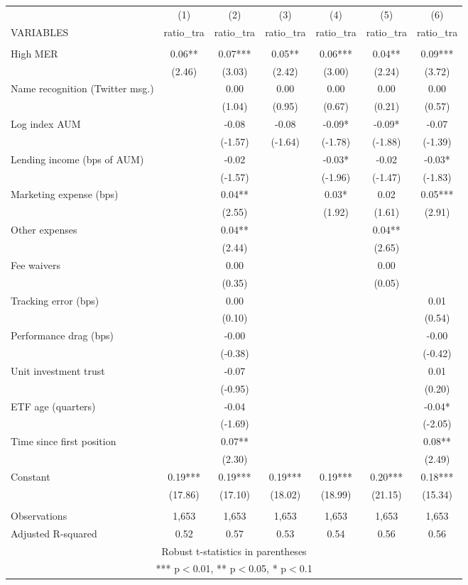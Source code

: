 \documentclass[]{article}
\begin{document}
\begin{tabular}{lcccccc} \hline
 & (1) & (2) & (3) & (4) & (5) & (6) \\
VARIABLES & ratio\_tra & ratio\_tra & ratio\_tra & ratio\_tra & ratio\_tra & ratio\_tra \\ \hline
 &  &  &  &  &  &  \\
High MER & 0.06** & 0.07*** & 0.05** & 0.06*** & 0.04** & 0.09*** \\
 & (2.46) & (3.03) & (2.42) & (3.00) & (2.24) & (3.72) \\
Name recognition (Twitter msg.) &  & 0.00 & 0.00 & 0.00 & 0.00 & 0.00 \\
 &  & (1.04) & (0.95) & (0.67) & (0.21) & (0.57) \\
Log index AUM &  & -0.08 & -0.08 & -0.09* & -0.09* & -0.07 \\
 &  & (-1.57) & (-1.64) & (-1.78) & (-1.88) & (-1.39) \\
Lending income (bps of AUM) &  & -0.02 &  & -0.03* & -0.02 & -0.03* \\
 &  & (-1.57) &  & (-1.96) & (-1.47) & (-1.83) \\
Marketing expense (bps) &  & 0.04** &  & 0.03* & 0.02 & 0.05*** \\
 &  & (2.55) &  & (1.92) & (1.61) & (2.91) \\
Other expenses &  & 0.04** &  &  & 0.04** &  \\
 &  & (2.44) &  &  & (2.65) &  \\
Fee waivers &  & 0.00 &  &  & 0.00 &  \\
 &  & (0.35) &  &  & (0.05) &  \\
Tracking error (bps) &  & 0.00 &  &  &  & 0.01 \\
 &  & (0.10) &  &  &  & (0.54) \\
Performance drag (bps) &  & -0.00 &  &  &  & -0.00 \\
 &  & (-0.38) &  &  &  & (-0.42) \\
Unit investment trust &  & -0.07 &  &  &  & 0.01 \\
 &  & (-0.95) &  &  &  & (0.20) \\
ETF age (quarters) &  & -0.04 &  &  &  & -0.04* \\
 &  & (-1.69) &  &  &  & (-2.05) \\
Time since first position &  & 0.07** &  &  &  & 0.08** \\
 &  & (2.30) &  &  &  & (2.49) \\
Constant & 0.19*** & 0.19*** & 0.19*** & 0.19*** & 0.20*** & 0.18*** \\
 & (17.86) & (17.10) & (18.02) & (18.99) & (21.15) & (15.34) \\
 &  &  &  &  &  &  \\
Observations & 1,653 & 1,653 & 1,653 & 1,653 & 1,653 & 1,653 \\
 Adjusted R-squared & 0.52 & 0.57 & 0.53 & 0.54 & 0.56 & 0.56 \\ \hline
\multicolumn{7}{c}{ Robust t-statistics in parentheses} \\
\multicolumn{7}{c}{ *** p$<$0.01, ** p$<$0.05, * p$<$0.1} \\
\end{tabular}
\end{document}
